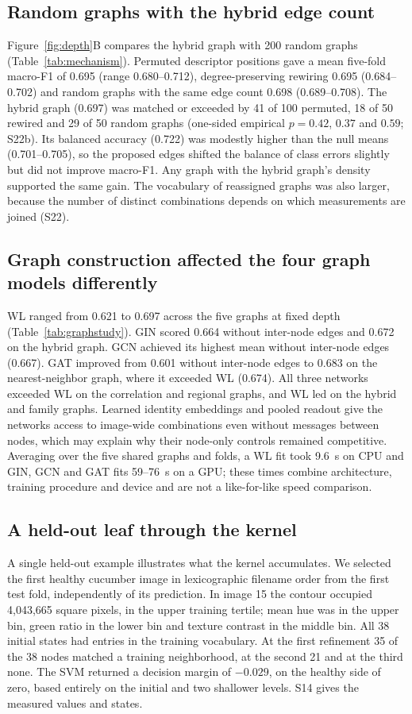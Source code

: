 \subsection{Random graphs with the hybrid edge count}
Figure~\ref{fig:depth}B compares the hybrid graph with 200 random graphs (Table~\ref{tab:mechanism}). Permuted descriptor positions gave a mean five-fold macro-F1 of 0.695 (range 0.680--0.712), degree-preserving rewiring 0.695 (0.684--0.702) and random graphs with the same edge count 0.698 (0.689--0.708). The hybrid graph (0.697) was matched or exceeded by 41 of 100 permuted, 18 of 50 rewired and 29 of 50 random graphs (one-sided empirical $p=0.42$, $0.37$ and $0.59$; S22b). Its balanced accuracy (0.722) was modestly higher than the null means (0.701--0.705), so the proposed edges shifted the balance of class errors slightly but did not improve macro-F1. Any graph with the hybrid graph's density supported the same gain. The vocabulary of reassigned graphs was also larger, because the number of distinct combinations depends on which measurements are joined (S22).

\subsection{Graph construction affected the four graph models differently}
WL ranged from 0.621 to 0.697 across the five graphs at fixed depth (Table~\ref{tab:graphstudy}). GIN scored 0.664 without inter-node edges and 0.672 on the hybrid graph. GCN achieved its highest mean without inter-node edges (0.667). GAT improved from 0.601 without inter-node edges to 0.683 on the nearest-neighbor graph, where it exceeded WL (0.674). All three networks exceeded WL on the correlation and regional graphs, and WL led on the hybrid and family graphs. Learned identity embeddings and pooled readout give the networks access to image-wide combinations even without messages between nodes, which may explain why their node-only controls remained competitive. Averaging over the five shared graphs and folds, a WL fit took 9.6~s on CPU and GIN, GCN and GAT fits 59--76~s on a GPU; these times combine architecture, training procedure and device and are not a like-for-like speed comparison.
\showpanel{\graphstudytable}

\subsection{A held-out leaf through the kernel}
A single held-out example illustrates what the kernel accumulates. We selected the first healthy cucumber image in lexicographic filename order from the first test fold, independently of its prediction. In image 15 the contour occupied 4,043,665 square pixels, in the upper training tertile; mean hue was in the upper bin, green ratio in the lower bin and texture contrast in the middle bin. All 38 initial states had entries in the training vocabulary. At the first refinement 35 of the 38 nodes matched a training neighborhood, at the second 21 and at the third none. The SVM returned a decision margin of $-0.029$, on the healthy side of zero, based entirely on the initial and two shallower levels. S14 gives the measured values and states.

